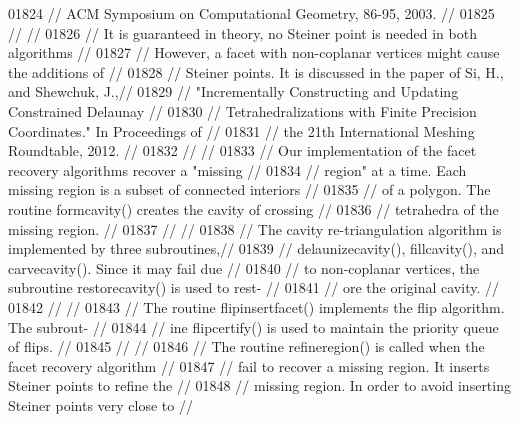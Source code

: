 \begin{DoxyCode}
01824 \textcolor{comment}{// ACM Symposium on Computational Geometry, 86-95, 2003.                     //}
01825 \textcolor{comment}{//                                                                           //}
01826 \textcolor{comment}{// It is guaranteed in theory, no Steiner point is needed in both algorithms //}
01827 \textcolor{comment}{// However, a facet with non-coplanar vertices might cause the  additions of //}
01828 \textcolor{comment}{// Steiner points. It is discussed in the paper of Si, H., and  Shewchuk, J.,//}
01829 \textcolor{comment}{// "Incrementally Constructing and Updating Constrained Delaunay             //}
01830 \textcolor{comment}{// Tetrahedralizations with Finite Precision Coordinates." In Proceedings of //}
01831 \textcolor{comment}{// the 21th International Meshing Roundtable, 2012.                          //}
01832 \textcolor{comment}{//                                                                           //}
01833 \textcolor{comment}{// Our implementation of the facet recovery algorithms recover a "missing    //}
01834 \textcolor{comment}{// region" at a time. Each missing region is a subset of connected interiors //}
01835 \textcolor{comment}{// of a polygon. The routine formcavity() creates the cavity of crossing     //}
01836 \textcolor{comment}{// tetrahedra of the missing region.                                         //}
01837 \textcolor{comment}{//                                                                           //}
01838 \textcolor{comment}{// The cavity re-triangulation algorithm is implemented by three subroutines,//}
01839 \textcolor{comment}{// delaunizecavity(), fillcavity(), and carvecavity(). Since it may fail due //}
01840 \textcolor{comment}{// to non-coplanar vertices, the subroutine restorecavity() is used to rest- //}
01841 \textcolor{comment}{// ore the original cavity.                                                  //}
01842 \textcolor{comment}{//                                                                           //}
01843 \textcolor{comment}{// The routine flipinsertfacet() implements the flip algorithm. The subrout- //}
01844 \textcolor{comment}{// ine flipcertify() is used to maintain the priority queue of flips.        // }
01845 \textcolor{comment}{//                                                                           //}
01846 \textcolor{comment}{// The routine refineregion() is called when the facet recovery algorithm    //}
01847 \textcolor{comment}{// fail to recover a missing region. It inserts Steiner points to refine the //}
01848 \textcolor{comment}{// missing region. In order to avoid inserting Steiner points very close to  //}

\end{DoxyCode}
